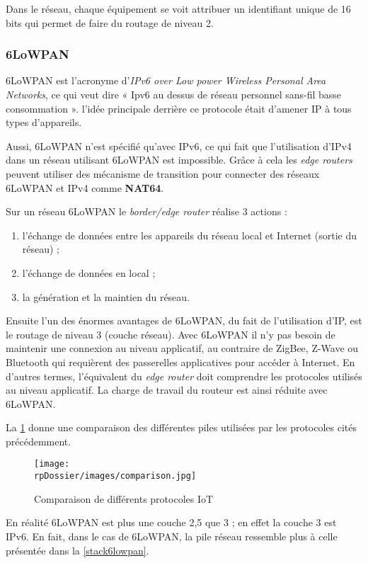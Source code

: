 Dans le réseau, chaque équipement se voit attribuer un identifiant unique de 16 bits qui permet de faire du routage de niveau 2.

\subsubsection{6LoWPAN}

6LoWPAN est l'acronyme d'\textit{IPv6 over Low power Wireless Personal Area Networks}, ce qui veut dire « Ipv6 au dessus de réseau personnel sans-fil basse consommation ». l'idée principale derrière ce protocole était d'amener IP à tous types d'appareils. 

Aussi, 6LoWPAN n'est spécifié qu'avec IPv6, ce qui fait que l'utilisation d'IPv4 dans un réseau utilisant 6LoWPAN est impossible. Grâce à cela les \textit{edge routers} peuvent utiliser des mécanisme de transition pour connecter des réseaux 6LoWPAN et IPv4 comme \textbf{NAT64}.

\noindent Sur un réseau 6LoWPAN le \textit{border/edge router} réalise 3 actions :
\begin{enumerate}
	\item l'échange de données entre les appareils du réseau local et Internet (sortie du réseau) ;
	\item l'échange de données en local ;
	\item la génération et la maintien du réseau.
\end{enumerate}

Ensuite l'un des énormes avantages de 6LoWPAN, du fait de l'utilisation d'IP, est le routage de niveau 3 (couche réseau). Avec 6LoWPAN il n'y pas besoin de maintenir une connexion au niveau applicatif, au contraire de ZigBee, Z-Wave ou Bluetooth qui requièrent des passerelles applicatives pour accéder à Internet. En d'autres termes, l'équivalent du \textit{edge router} doit comprendre les protocoles utilisés au niveau applicatif. La charge de travail du routeur est ainsi réduite avec 6LoWPAN.

La \cref{comparison} donne une comparaison des différentes piles utilisées par les protocoles cités précédemment.

\begin{figure}[H]
\centering
\texttt{[image: \\rpDossier/images/comparison.jpg]}
\caption{Comparaison de différents protocoles IoT}
\label{comparison}
\end{figure}

En réalité 6LoWPAN est plus une couche 2,5 que 3 ; en effet la couche 3 est IPv6. En fait, dans le cas de 6LoWPAN, la pile réseau ressemble plus à celle présentée dans la \cref{stack6lowpan}.


